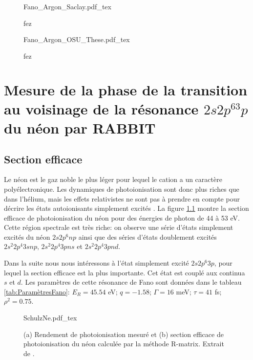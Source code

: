 
\begin{figure}
\centering
\def\svgwidth{1\textwidth}
{Fano_Argon_Saclay.pdf_tex}
\caption{fez}
\label{fig:Phases_Argon_Saclay}
\end{figure}

\begin{figure}
\centering
\def\svgwidth{1\textwidth}
{Fano_Argon_OSU_These.pdf_tex}
\caption{fez}
\label{fig:Phases_Argon_OSU}
\end{figure}





\chapter[Mesure de la phase de la transition au voisinage de la résonance $2s2p^63p$ du néon par RABBIT]{Mesure de la phase de la transition au voisinage de la résonance \MakeLowercase{$2s2p^63p$} du néon par RABBIT}

\section{Section efficace}
Le néon est le gaz noble le plus léger pour lequel le cation a un caractère polyélectronique. Les dynamiques de photoionisation sont donc plus riches que dans l'hélium, mais les effets relativistes ne sont pas à prendre en compte pour décrire les états autoionisants simplement excités . La figure \ref{fig:SchulzNe} montre la section efficace de photoionisation du néon pour des énergies de photon de 44 à 53 eV. Cette région spectrale est très riche: on observe une série d'états simplement excités du néon $2s2p^{6}np$ ainsi que des séries d'états doublement excités $2s^{2}2p^{4}3snp$, $2s^{2}2p^{4}3pns$ et $2s^{2}2p^{4}3pnd$. 

Dans la suite nous nous intéressons à l'état simplement excité $2s2p^{6}3p$, pour lequel la section efficace est la plus importante. Cet état est couplé aux continua $s$ et $d$. Les paramètres de cette résonance de Fano sont données dans le tableau \ref{tab:ParamètresFano}: $E_R = 45.54$ eV; $q = -1.58$; $\Gamma =  16$ meV; $\tau = 41$ fs; $\rho^2 = 0.75$.

\begin{figure}
\centering
\def\svgwidth{0.6\textwidth}
{SchulzNe.pdf_tex}
\caption{(a) Rendement de photoionisation mesuré et (b) section efficace de photoionisation du néon calculée par la méthode R-matrix. Extrait de .}
\label{fig:SchulzNe}
\end{figure}

